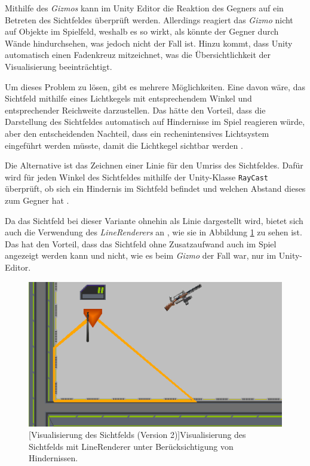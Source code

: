 Mithilfe des \textit{Gizmos} kann im Unity Editor die Reaktion des Gegners auf ein Betreten des Sichtfeldes überprüft werden. Allerdings reagiert das \textit{Gizmo} nicht auf Objekte im Spielfeld, weshalb es so wirkt, als könnte der Gegner durch Wände hindurchsehen, was jedoch nicht der Fall ist. Hinzu kommt, dass Unity automatisch einen Fadenkreuz mitzeichnet, was die Übersichtlichkeit der Visualisierung beeinträchtigt.

Um dieses Problem zu lösen, gibt es mehrere Möglichkeiten. Eine davon wäre, das Sichtfeld mithilfe eines Lichtkegels mit entsprechendem Winkel und entsprechender Reichweite darzustellen. Das hätte den Vorteil, dass die Darstellung des Sichtfeldes automatisch auf Hindernisse im Spiel reagieren würde, aber den entscheidenden Nachteil, dass ein rechenintensives Lichtsystem eingeführt werden müsste, damit die Lichtkegel sichtbar werden \cite{Unity_Doc_Lighting}.

Die Alternative ist das Zeichnen einer Linie für den Umriss des Sichtfeldes. Dafür wird für jeden Winkel des Sichtfeldes mithilfe der Unity-Klasse \texttt{RayCast} überprüft, ob sich ein Hindernis im Sichtfeld befindet und welchen Abstand dieses zum Gegner hat \cite{Unity_Doc_RayCast}.

Da das Sichtfeld bei dieser Variante ohnehin als Linie dargestellt wird, bietet sich auch die Verwendung des \textit{LineRenderers} an \cite{Unity_Doc_LineRenderer}, wie sie in Abbildung \ref{fig:fov2} zu sehen ist. Das hat den Vorteil, dass das Sichtfeld ohne Zusatzaufwand auch im Spiel angezeigt werden kann und nicht, wie es beim \textit{Gizmo} der Fall war, nur im Unity-Editor.

\begin{figure}[h]
 \centering
 \includegraphics[width=0.835\linewidth]{pics/field-of-view_game.png}
 [Visualisierung des Sichtfelds (Version 2)]{Visualisierung des Sichtfelds mit LineRenderer unter Berücksichtigung von Hindernissen.}
	\label{fig:fov2}
\end{figure}

